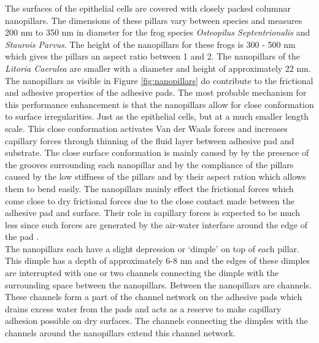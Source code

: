 \qquad The surfaces of the epithelial cells are covered with closely packed columnar nanopillars. The dimensions of these pillars vary between species and measures 200 nm to 350 nm in diameter for the frog species \textit{Osteopilus Septentrionalis} and \textit{Staurois Parvus}. The height of the nanopillars for these frogs is 300 - 500 nm which gives the pillars an aspect ratio between 1 and 2. The nanopillars of the \textit{Litoria Caerulea} are smaller with a diameter and height of approximately 22 nm.\\ 

\qquad The nanopillars as visible in Figure \ref{fig:nanopillars} do contribute to the frictional and adhesive properties of the adhesive pads. The most probable mechanism for this performance enhancement is that the nanopillars allow for close conformation to surface irregularities. Just as the epithelial cells, but at a much smaller length scale. This close conformation activates Van der Waals forces and increases capillary forces through thinning of the fluid layer between adhesive pad and substrate. The close surface conformation is mainly caused by by the presence of the grooves surrounding each nanopillar and by the compliance of the pillars caused by the low stiffness of the pillars and by their aspect ration which allows them to bend easily. The nanopillars mainly effect the frictional forces which come close to dry frictional forces due to the close contact made between the adhesive pad and surface. Their role in capillary forces is expected to be much less since such forces are generated by the air-water interface around the edge of the pad \cite{ernst1973digital}.\\

\qquad The nanopillars each have a slight depression or ‘dimple’ on top of each pillar. This dimple has a depth of approximately 6-8 nm and the edges of these dimples are interrupted with one or two channels connecting the dimple with the surrounding space between the nanopillars. Between the nanopillars are channels. These channels form a part of the channel network on the adhesive pads which drains excess water from the pads and acts as a reserve to make capillary adhesion possible on dry surfaces. The channels connecting the dimples with the channels around the nanopillars extend this channel network.\\ 

